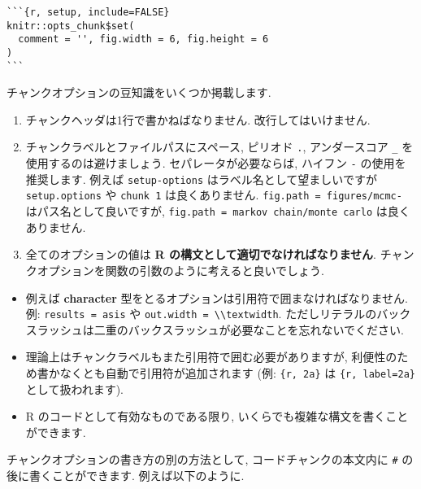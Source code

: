 \documentclass[
  lualatex,ja=standard,jafont=noto-otf]{bxjsreport}
\providecommand{\tightlist}{%
  \setlength{\itemsep}{0pt}\setlength{\parskip}{0pt}}
\begin{document}
\begin{verbatim}
```{r, setup, include=FALSE}
knitr::opts_chunk$set(
  comment = '', fig.width = 6, fig.height = 6
)
```
\end{verbatim}

チャンクオプションの豆知識をいくつか掲載します.

\begin{enumerate}
\def\labelenumi{\arabic{enumi}.}
\tightlist
\item
  チャンクヘッダは1行で書かねばなりません. 改行してはいけません.
\item
  チャンクラベルとファイルパスにスペース, ピリオド \texttt{.},
  アンダースコア \texttt{\_} を使用するのは避けましょう.
  セパレータが必要ならば, ハイフン \texttt{-} の使用を推奨します. 例えば
  \texttt{setup-options} はラベル名として望ましいですが
  \texttt{setup.options} や \texttt{chunk\ 1} は良くありません.
  \texttt{fig.path\ =\ \textquotesingle{}figures/mcmc-\textquotesingle{}}
  はパス名として良いですが,
  \texttt{fig.path\ =\ \textquotesingle{}markov\ chain/monte\ carlo\textquotesingle{}}
  は良くありません.
\item
  全てのオプションの値は \textbf{R
  の構文として適切でなければなりません}.
  チャンクオプションを関数の引数のように考えると良いでしょう.
\end{enumerate}

\begin{itemize}
\tightlist
\item
  例えば \textbf{character}
  型をとるオプションは引用符で囲まなければなりません. 例:
  \texttt{results\ =\ \textquotesingle{}asis\textquotesingle{}} や
  \texttt{out.width\ =\ \textquotesingle{}\textbackslash{}\textbackslash{}textwidth\textquotesingle{}}.
  ただしリテラルのバックスラッシュは二重のバックスラッシュが必要なことを忘れないでください.
\item
  理論上はチャンクラベルもまた引用符で囲む必要がありますが,
  利便性のため書かなくとも自動で引用符が追加されます (例:
  \texttt{\textasciigrave{}\textasciigrave{}\textasciigrave{}\{r,\ 2a\}\textasciigrave{}\textasciigrave{}\textasciigrave{}}
  は
  \texttt{\textasciigrave{}\textasciigrave{}\textasciigrave{}\{r,\ label=\textquotesingle{}2a\textquotesingle{}\}\textasciigrave{}\textasciigrave{}\textasciigrave{}}
  として扱われます).
\item
  R のコードとして有効なものである限り,
  いくらでも複雑な構文を書くことができます.
\end{itemize}

チャンクオプションの書き方の別の方法として, コードチャンクの本文内に
\texttt{\#\textbar{}} の後に書くことができます. 例えば以下のように.
\end{document}
